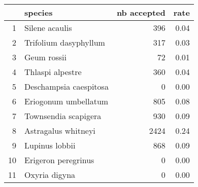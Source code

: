 \begin{table}[ht]
\centering
\begin{tabular}{rlrr}
  \hline
 & species & nb accepted & rate \\ 
  \hline
1 & Silene acaulis & 396 & 0.04 \\ 
  2 & Trifolium dasyphyllum & 317 & 0.03 \\ 
  3 & Geum rossii & 72 & 0.01 \\ 
  4 & Thlaspi alpestre & 360 & 0.04 \\ 
  5 & Deschampsia caespitosa & 0 & 0.00 \\ 
  6 & Eriogonum umbellatum & 805 & 0.08 \\ 
  7 & Townsendia scapigera & 930 & 0.09 \\ 
  8 & Astragalus whitneyi & 2424 & 0.24 \\ 
  9 & Lupinus lobbii & 868 & 0.09 \\ 
  10 & Erigeron peregrinus & 0 & 0.00 \\ 
  11 & Oxyria digyna & 0 & 0.00 \\ 
   \hline
\end{tabular}
\end{table}
